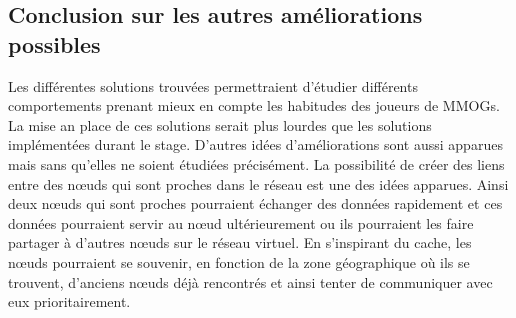 \subsection{Conclusion sur les autres améliorations possibles}

Les différentes solutions trouvées permettraient d'étudier différents comportements prenant mieux en compte les habitudes des joueurs de MMOGs. La mise an place de ces solutions serait plus lourdes que les solutions implémentées durant le stage. 
D'autres idées d'améliorations sont aussi apparues mais sans qu'elles ne soient étudiées précisément. La possibilité de créer des liens entre des nœuds qui sont proches dans le réseau est une des idées apparues. Ainsi deux nœuds qui sont proches pourraient échanger des données rapidement et ces données pourraient servir au nœud ultérieurement ou ils pourraient les faire partager à d'autres nœuds sur le réseau virtuel. En s'inspirant du cache, les nœuds pourraient se souvenir, en fonction de la zone géographique où ils se trouvent, d'anciens nœuds déjà rencontrés et ainsi tenter de communiquer avec eux prioritairement.



